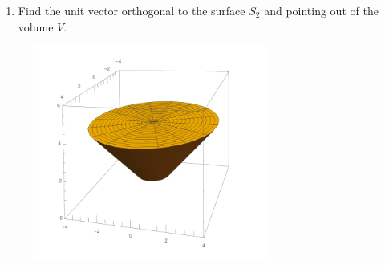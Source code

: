 \documentclass[fleqn]{article}
\begin{document}
\begin{enumerate}
\begin{enumerate}
      \item Find the unit vector orthogonal to the surface $S_2$ and pointing out of the volume $V$. 
    \end{enumerate}

    \begin{center}
      \includegraphics[height=7cm, width=10cm]{second.png}
    \end{center}
  \end{enumerate}
\end{document}
